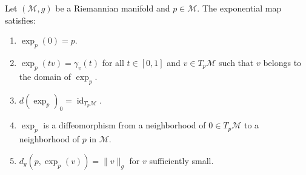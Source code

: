 \begin{proposition}\label{prop:propiedades_exp}
Let $(\mathcal{M}, g)$ be a Riemannian manifold and $p \in \mathcal{M}$. The exponential map satisfies:
\begin{enumerate}
	\item $\exp_p(0) = p$.
	\item $\exp_p(tv) = \gamma_v(t)$ for all $t \in [0,1]$ and $v \in T_p\mathcal{M}$ such that $v$ belongs to the domain of $\exp_p$.
	\item $d(\exp_p)_0 = \operatorname{id}_{T_p\mathcal{M}}$.
	\item $\exp_p$ is a diffeomorphism from a neighborhood of $0 \in T_p\mathcal{M}$ to a neighborhood of $p$ in $\mathcal{M}$.
	\item $d_g(p, \exp_p(v)) = \|v\|_g$ for $v$ sufficiently small.
\end{enumerate}
\end{proposition}

